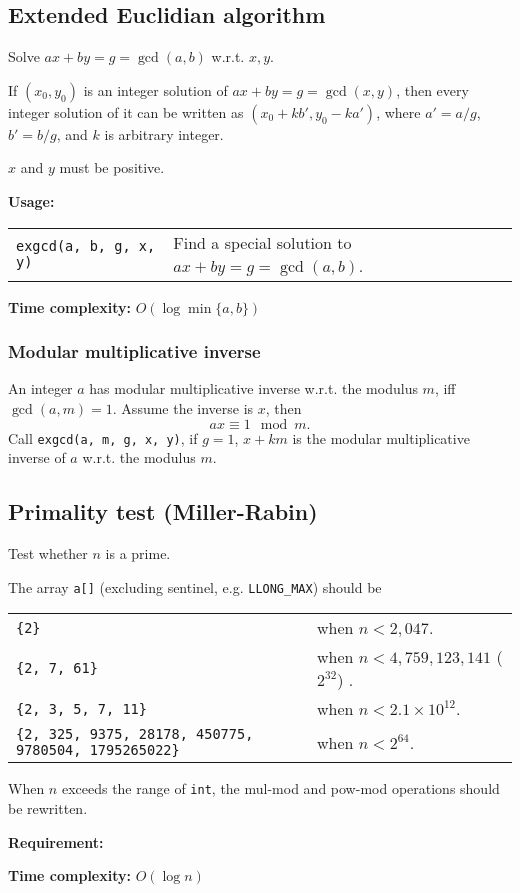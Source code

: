 \subsection{Extended Euclidian algorithm} %
Solve $ax + by = g = \gcd(a,b)$ w.r.t. $x, y$. \par
If $(x_0, y_0)$ is an integer solution of $ax + by = g = \gcd(x,y)$, then every integer solution of it can be written as $(x_0 + kb', y_0 - ka')$, where $a' = a/g$, $b' = b/g$, and $k$ is arbitrary integer. \par
\Warning $x$ and $y$ must be positive. \par
\textbf{Usage:} \\[0.1cm]
\begin{tabular}{p{4cm} p{7cm}}
  \lstinline|exgcd(a, b, g, x, y)| & Find a special solution to $ax + by = g = \gcd(a, b)$. \\
\end{tabular} \par
\textbf{Time complexity:} $O(\log \min \{a,b\})$ \par


\subsubsection{Modular multiplicative inverse}
An integer $a$ has modular multiplicative inverse w.r.t. the modulus $m$, iff $\gcd(a, m) = 1$. Assume the inverse is $x$, then
$$ ax \equiv 1 \mod m \text{.}$$
Call \lstinline|exgcd(a, m, g, x, y)|, if $g = 1$, $x + km$ is the modular multiplicative inverse of $a$ w.r.t. the modulus $m$. \par


\subsection{Primality test (Miller-Rabin)}
Test whether $n$ is a prime. \par
The array \lstinline|a[]| (excluding sentinel, e.g. \lstinline|LLONG_MAX|) should be \\
\begin{tabular}{p{6cm} p{5cm}}
  \lstinline|{2}| & when $n < 2,047$. \\
  \lstinline|{2, 7, 61}| & when $n < 4,759,123,141$ ($2^{32}$) . \\
  \lstinline|{2, 3, 5, 7, 11}| & when $n < 2.1 \times 10^{12}$. \\
  \lstinline|{2, 325, 9375, 28178, 450775, 9780504, 1795265022}| & when $n < 2^{64}$.
\end{tabular} \par
\Warning When $n$ exceeds the range of \lstinline|int|, the mul-mod and pow-mod operations should be rewritten. \par
\textbf{Requirement:} \\
 \par
\textbf{Time complexity:} $O(\log n)$ \par


